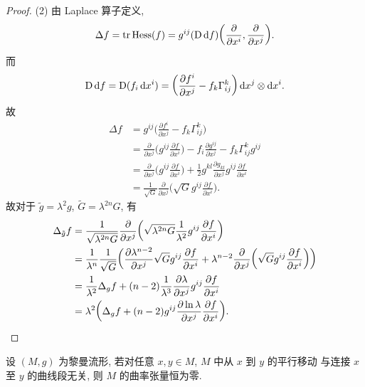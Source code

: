 \begin{proof}
  (2) 由 Laplace 算子定义,
  \[\Delta f = \tr\operatorname{Hess}(f) = g^{ij}(\operatorname{D}\mathop{}\!\mathrm{d} f)
    \biggl(\frac{\partial}{\partial x^i},\frac{\partial}{\partial x^j}\biggr).\]
  而
  \[\operatorname{D}\mathop{}\!\mathrm{d} f = \operatorname{D}(f_i\mathop{}\!\mathrm{d} x^i)
    = \biggl(\frac{\partial f^i}{\partial x^j}-f_k\Gamma_{ij}^k\biggr)\mathop{}\!\mathrm{d} x^j\otimes\mathop{}\!\mathrm{d} x^i.\]
  故
  \begin{align*}
    \Delta f
    & = g^{ij}\biggl(\frac{\partial f^i}{\partial x^j}-f_k\Gamma_{ij}^k\biggr) \\
    & = \frac{\partial}{\partial x^j}\biggl(g^{ij}\frac{\partial f}{\partial x^i}\biggr)
      - f_i\frac{\partial g^{ij}}{\partial x^j}
      - f_k\Gamma_{ij}^k g^{ij} \\
    & = \frac{\partial}{\partial x^j}\biggl(g^{ij}\frac{\partial f}{\partial x^i}\biggr)
      + \frac{1}{2}g^{kl}\frac{\partial g_{kl}}{\partial x^j}
      g^{ij}\frac{\partial f}{\partial x^i} \\
    & = \frac{1}{\sqrt{G}}\frac{\partial}{\partial x^j}
      \biggl(\sqrt{G} g^{ij}\frac{\partial f}{\partial x^i}\biggr).
  \end{align*}
  故对于 $\tilde{g}=\lambda^2 g$, $\widetilde{G}=\lambda^{2n} G$, 有
  \begin{align*}
    \Delta_{\tilde{g}} f
    & = \frac{1}{\sqrt{\lambda^{2n} G}} \frac{\partial}{\partial x^j}
      \biggl(\sqrt{\lambda^{2n}G} \frac{1}{\lambda^2} g^{ij} \frac{\partial f}{\partial x^i}\biggr) \\
    & = \frac{1}{\lambda^n}\frac{1}{\sqrt{G}}
      \biggl(\frac{\partial\lambda^{n-2}}{\partial x^j} \sqrt{G} g^{ij}
      \frac{\partial f}{\partial x^i}
      + \lambda^{n-2}\frac{\partial}{\partial x^j}
        \biggl(\sqrt{G} g^{ij} \frac{\partial f}{\partial x^i}\biggr)
      \biggr) \\
    & = \frac{1}{\lambda^2}\Delta_g f + (n-2) \frac{1}{\lambda^3}\frac{\partial\lambda}{\partial x^j}
      g^{ij}\frac{\partial f}{\partial x^i} \\
    & = \lambda^2\biggl(\Delta_g f+(n-2)g^{ij}\frac{\partial\ln\lambda}{\partial x^j}
      \frac{\partial f}{\partial x^i}\biggr).\qedhere
  \end{align*}
\end{proof}



\begin{exercise}[6]
  设 $(M,g)$ 为黎曼流形, 若对任意 $x,y\in M$, $M$ 中从 $x$ 到 $y$ 的平行移动
  与连接 $x$ 至 $y$ 的曲线段无关, 则 $M$ 的曲率张量恒为零.
\end{exercise}

